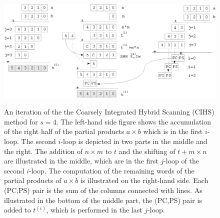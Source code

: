 \documentclass[twocolumn]{svjour3}          %
\begin{document}
\begin{figure}[ht]
\caption[An iteration of the Coarsely Integrated Hybrid Scanning (CIHS)
method.]
{An iteration of the the Coarsely Integrated Hybrid Scanning (CIHS)
method for $s=4$.
%
The left-hand side figure shows the
accumulation of the right half of the partial products $a\times b$
which is in the first $i$-loop.
%
The second $i$-loop is depicted in two parts in the middle and the
right.  The addition of $n\times m$ to $t$ and the shifting of
$t+m\times n$ are illustrated in the middle, which are
in the first $j$-loop of the second $i$-loop.
%
The computation of the remaining words of the partial products of
$a\times b$ is illustrated on the right-hand side.  Each (PC,PS) pair
is the sum of the columns connected with lines.
%
As illustrated in the bottom of the middle part, the (PC,PS) pair is
added to $t^{(i)}$, which is performed in the last $j$-loop.}
\includegraphics[width=\columnwidth]{cihs.eps}
\label{cihs}
\end{figure}
\end{document}
